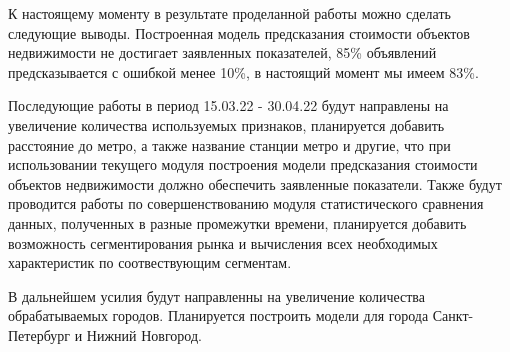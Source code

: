 \Conclusion %

К настоящему моменту в результате проделанной работы можно сделать следующие выводы. Построенная модель предсказания стоимости объектов недвижимости не достигает заявленных показателей, 85\% объявлений предсказывается с ошибкой менее 10\%, в настоящий момент мы имеем 83\%. 


Последующие работы в период 15.03.22 - 30.04.22 будут направлены на увеличение количества используемых признаков, планируется добавить расстояние до метро, а также название станции метро и другие, что при использовании текущего модуля построения модели предсказания стоимости объектов недвижимости должно обеспечить заявленные показатели. Также будут проводится работы по совершенствованию модуля статистического сравнения данных, полученных в разные промежутки времени, планируется добавить возможность сегментирования рынка и вычисления всех необходимых характеристик по соотвествующим сегментам.


В дальнейшем усилия будут направленны на увеличение количества обрабатываемых городов. Планируется построить модели для города Санкт-Петербург и Нижний Новгород.



